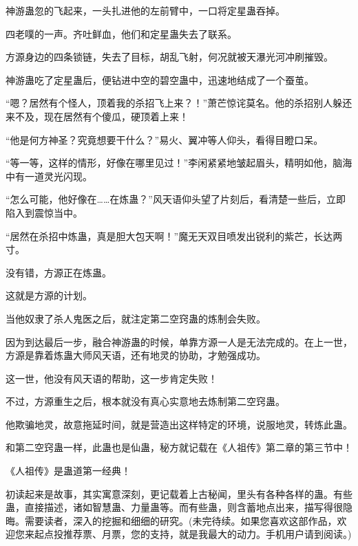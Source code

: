 \begin{this_body}
神游蛊忽的飞起来，一头扎进他的左前臂中，一口将定星蛊吞掉。

四老噗的一声。齐吐鲜血，他们和定星蛊失去了联系。

方源身边的四条锁链，失去了目标，胡乱飞射，何况就被天瀑光河冲刷摧毁。

神游蛊吃了定星蛊后，便钻进中空的碧空蛊中，迅速地结成了一个蚕茧。

“嗯？居然有个怪人，顶着我的杀招飞上来？！”萧芒惊诧莫名。他的杀招别人躲还来不及，现在居然有个傻瓜，硬顶着上来！

“他是何方神圣？究竟想要干什么？”易火、翼冲等人仰头，看得目瞪口呆。

“等一等，这样的情形，好像在哪里见过！”李闲紧紧地皱起眉头，精明如他，脑海中有一道灵光闪现。

“怎么可能，他好像在……在炼蛊？”风天语仰头望了片刻后，看清楚一些后，立即陷入到震惊当中。

“居然在杀招中炼蛊，真是胆大包天啊！”魔无天双目喷发出锐利的紫芒，长达两寸。

没有错，方源正在炼蛊。

这就是方源的计划。

当他奴隶了杀人鬼医之后，就注定第二空窍蛊的炼制会失败。

因为到达最后一步，融合神游蛊的时候，单靠方源一人是无法完成的。在上一世，方源是靠着炼蛊大师风天语，还有地灵的协助，才勉强成功。

这一世，他没有风天语的帮助，这一步肯定失败！

不过，方源重生之后，根本就没有真心实意地去炼制第二空窍蛊。

他欺骗地灵，故意拖延时间，就是营造出这样特定的环境，说服地灵，转炼此蛊。

和第二空窍蛊一样，此蛊也是仙蛊，秘方就记载在《人祖传》第二章的第三节中！

《人祖传》是蛊道第一经典！

初读起来是故事，其实寓意深刻，更记载着上古秘闻，里头有各种各样的蛊。有些蛊，直接描述，诸如智慧蛊、力量蛊等。而有些蛊，则含蓄地点出来，描写得很隐晦。需要读者，深入的挖掘和细细的研究。(未完待续。如果您喜欢这部作品，欢迎您来起点投推荐票、月票，您的支持，就是我最大的动力。手机用户请到阅读。)

\end{this_body}

